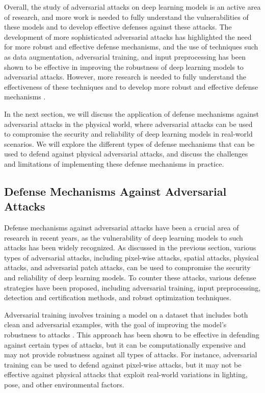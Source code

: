 \documentclass[11pt]{article}
\begin{document}
Overall, the study of adversarial attacks on deep learning models is an active area of research, and more work is needed to fully understand the vulnerabilities of these models and to develop effective defenses against these attacks. The development of more sophisticated adversarial attacks has highlighted the need for more robust and effective defense mechanisms, and the use of techniques such as data augmentation, adversarial training, and input preprocessing has been shown to be effective in improving the robustness of deep learning models to adversarial attacks. However, more research is needed to fully understand the effectiveness of these techniques and to develop more robust and effective defense mechanisms \cite{ref42}.

In the next section, we will discuss the application of defense mechanisms against adversarial attacks in the physical world, where adversarial attacks can be used to compromise the security and reliability of deep learning models in real-world scenarios. We will explore the different types of defense mechanisms that can be used to defend against physical adversarial attacks, and discuss the challenges and limitations of implementing these defense mechanisms in practice.

\subsection{Defense Mechanisms Against Adversarial Attacks}

Defense mechanisms against adversarial attacks have been a crucial area of research in recent years, as the vulnerability of deep learning models to such attacks has been widely recognized. As discussed in the previous section, various types of adversarial attacks, including pixel-wise attacks, spatial attacks, physical attacks, and adversarial patch attacks, can be used to compromise the security and reliability of deep learning models. To counter these attacks, various defense strategies have been proposed, including adversarial training, input preprocessing, detection and certification methods, and robust optimization techniques.

Adversarial training involves training a model on a dataset that includes both clean and adversarial examples, with the goal of improving the model's robustness to attacks \cite{ref43}. This approach has been shown to be effective in defending against certain types of attacks, but it can be computationally expensive and may not provide robustness against all types of attacks. For instance, adversarial training can be used to defend against pixel-wise attacks, but it may not be effective against physical attacks that exploit real-world variations in lighting, pose, and other environmental factors.
\end{document}
